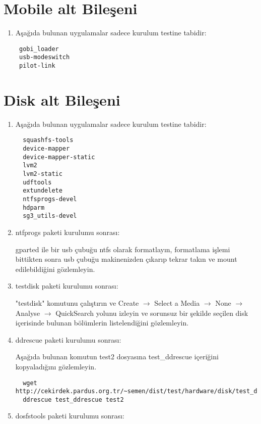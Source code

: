 \documentclass[a4paper,10pt]{article}
\begin{document}
\section{Mobile alt Bileşeni}
\begin{enumerate}
 \item Aşağıda bulunan uygulamalar sadece kurulum testine tabidir:
\begin{verbatim}
 gobi_loader
 usb-modeswitch
 pilot-link
\end{verbatim}

\end{enumerate}

\section{Disk alt Bileşeni}
\begin{enumerate}
 \item Aşağıda bulunan uygulamalar sadece kurulum testine tabidir:
\begin{verbatim}
  squashfs-tools
  device-mapper
  device-mapper-static
  lvm2
  lvm2-static
  udftools
  extundelete
  ntfsprogs-devel
  hdparm
  sg3_utils-devel
\end{verbatim}
\item ntfprogs paketi kurulumu sonrası:

gparted ile bir usb çubuğu ntfs olarak formatlayın, formatlama işlemi bittikten sonra usb çubuğu makinenizden çıkarıp tekrar takın ve mount edilebildiğini gözlemleyin. 

\item testdisk paketi kurulumu sonrası:

 "testdisk" komutunu çalıştırın ve Create $\rightarrow$ Select a Media $\rightarrow$ None $\rightarrow$ Analyse $\rightarrow$ QuickSearch yolunu izleyin ve sorunsuz bir şekilde seçilen disk içerisinde bulunan bölümlerin listelendiğini gözlemleyin.

\item ddrescue paketi kurulumu sonrası:

Aşağıda bulunan komutun test2 dosyasına test\_ddrescue içeriğini kopyaladığını gözlemleyin.
 \begin{verbatim}
  wget http://cekirdek.pardus.org.tr/~semen/dist/test/hardware/disk/test_ddrescue
  ddrescue test_ddrescue test2
 \end{verbatim}

\item dosfstools paketi kurulumu sonrası:


\end{enumerate}
\end{document}

